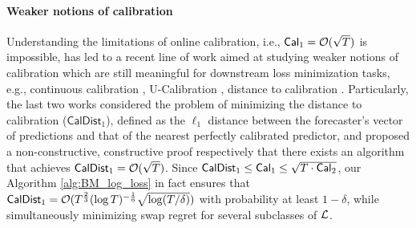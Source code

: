 \paragraph{Weaker notions of calibration} Understanding the limitations of online calibration, i.e., $\cal_{1} = \cO(\sqrt{T})$ is impossible, has led to a recent line of work aimed at studying weaker notions of calibration which are still meaningful for downstream loss minimization tasks, e.g., continuous calibration \citep{foster2021forecast}, U-Calibration \citep{kleinberg2023u}, distance to calibration \citep{pmlr-v247-qiao24a, arunachaleswaran2025elementary}. Particularly, the last two works 
considered the problem of minimizing the distance to calibration ($\mathsf{CalDist}_{1}$), defined as the $\ell_{1}$ distance between the forecaster's vector of predictions and that of the nearest perfectly calibrated predictor, and proposed a non-constructive, constructive proof respectively
that there exists an algorithm that achieves $\mathsf{CalDist}_{1} = \cO(\sqrt{T})$. Since $\mathsf{CalDist}_{1} \le \cal_{1} \le \sqrt{T \cdot \cal_{2}}$, our Algorithm \ref{alg:BM_log_loss} in fact ensures that $\mathsf{CalDist}_{1} = {\cO}(T^{\frac{2}{3}} (\log T) ^ {-\frac{1}{6}}\sqrt{\log (T/\delta)})$ with probability at least $1 - \delta$, while simultaneously minimizing swap regret for several subclasses of $\cL$.

